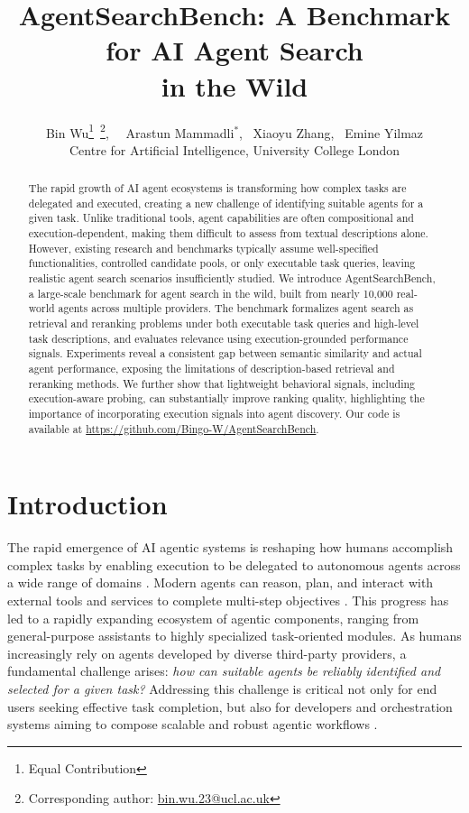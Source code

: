 \documentclass{article} %
\title{AgentSearchBench: A Benchmark for AI Agent Search \\ in the Wild}
\author{Bin Wu\thanks{Equal Contribution}
\,\thanks{Corresponding author: \href{mailto:bin.wu.23@ucl.ac.uk}{bin.wu.23@ucl.ac.uk}}, 
\ \ Arastun Mammadli$^{*}$, 
\ Xiaoyu Zhang, 
\ Emine Yilmaz \\
Centre for Artificial Intelligence, University College London
}
\begin{document}
\ifcolmsubmission
\linenumbers
\fi

\maketitle

\begin{abstract}
The rapid growth of AI agent ecosystems is transforming how complex tasks are delegated and executed, creating a new challenge of identifying suitable agents for a given task. Unlike traditional tools, agent capabilities are often compositional and execution-dependent, making them difficult to assess from textual descriptions alone. However, existing research and benchmarks typically assume well-specified functionalities, controlled candidate pools, or only executable task queries, leaving realistic agent search scenarios insufficiently studied. We introduce AgentSearchBench, a large-scale benchmark for agent search in the wild, built from nearly 10,000 real-world agents across multiple providers. The benchmark formalizes agent search as retrieval and reranking problems under both executable task queries and high-level task descriptions, and evaluates relevance using execution-grounded performance signals. Experiments reveal a consistent gap between semantic similarity and actual agent performance, exposing the limitations of description-based retrieval and reranking methods. We further show that lightweight behavioral signals, including execution-aware probing, can substantially improve ranking quality, highlighting the importance of incorporating execution signals into agent discovery. Our code is available at \href{https://github.com/Bingo-W/AgentSearchBench}{https://github.com/Bingo-W/AgentSearchBench}.

\end{abstract}


\section{Introduction}
The rapid emergence of AI agentic systems is reshaping how humans accomplish complex tasks by enabling execution to be delegated to autonomous agents across a wide range of domains \citep{DBLP:journals/corr/abs-2508-07407, DBLP:journals/tmlr/GaoGHHJLLQQRWWXZZZXFZLQ26}. Modern agents can reason, plan, and interact with external tools and services to complete multi-step objectives \citep{DBLP:journals/corr/abs-2402-02716, DBLP:journals/corr/abs-2504-19678, DBLP:journals/csur/QinHLCDCZZHXHFSWQTZLSXZ25}. This progress has led to a rapidly expanding ecosystem of agentic components, ranging from general-purpose assistants to highly specialized task-oriented modules. As humans increasingly rely on agents developed by diverse third-party providers, a fundamental challenge arises: \textit{how can suitable agents be reliably identified and selected for a given task?} Addressing this challenge is critical not only for end users seeking effective task completion, but also for developers and orchestration systems aiming to compose scalable and robust agentic workflows \citep{DBLP:journals/corr/abs-2411-04468, hu2025owl}.
\end{document}
